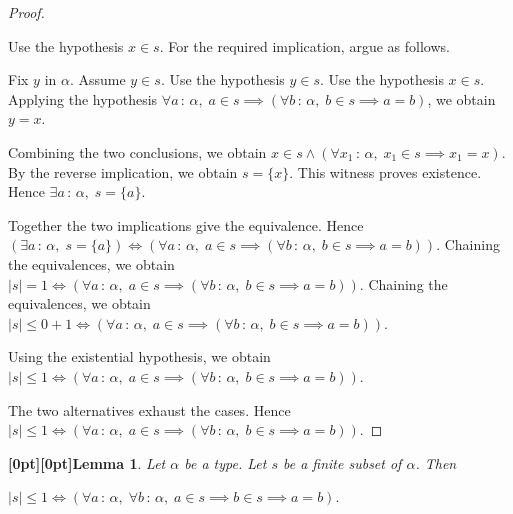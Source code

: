 \documentclass{article}
\makeatletter
\newcommand{\paperanchor}[1]{\hypertarget{#1}{}}%
\def\paperdest{\pdfextension dest}\def\paperstart{\pdfextension startlink}%
\def\paperend{\pdfextension endlink}\def\papercolor{\pdfextension colorstack}%
\let\paperdest\pdfdest\let\paperstart\pdfstartlink\let\paperend\pdfendlink\let\papercolor\pdfcolorstack
\newcommand{\paperanchor}[1]{\paperdest name{#1} xyz}%
\newcommand{\paperanchor}[1]{\special{pdf:dest (#1) [@thispage /XYZ null @ypos null]}}%
\newcommand{\paperlineanchor}[1]{\raisebox{10pt}[0pt][0pt]{\paperanchor{#1}}}
\DeclareRobustCommand{\paperresultname}[1]{\paperlineanchor{theorem:\arabic{theorem}}#1}
\theoremstyle{paperresult}
\newtheorem{lemma}[theorem]{\paperresultname{Lemma}}
\newenvironment{proofstep}{\par\smallskip\ifdim\leftskip<3em\relax\advance\leftskip by 1em\relax\fi\noindent\ignorespaces}{\par\smallskip}
\makeatother
\begin{document}
\begin{proof}
\begin{proofstep}
\begin{proofstep}
\begin{proofstep}
Use the hypothesis \(x \in s\).
For the required implication, argue as follows.
\begin{proofstep}
Fix \(y\) in \(\alpha\).
Assume \(y \in s\).
Use the hypothesis \(y \in s\).
Use the hypothesis \(x \in s\).
Applying the hypothesis \(\forall a\, :\, \alpha,\; a \in s \implies \left(\forall b\, :\, \alpha,\; b \in s \implies a = b\right)\), we obtain \(y = x\).
\end{proofstep}
Combining the two conclusions, we obtain \(x \in s \land \left(\forall x_{1}\, :\, \alpha,\; x_{1} \in s \implies x_{1} = x\right)\).
By the reverse implication, we obtain \(s = \{x\}\).
This witness proves existence. Hence \(\exists a\, :\, \alpha,\; s = \{a\}\).
\end{proofstep}
Together the two implications give the equivalence. Hence \((\exists a\, :\, \alpha,\; s = \{a\}) \iff (\forall a\, :\, \alpha,\; a \in s \implies (\forall b\, :\, \alpha,\; b \in s \implies a = b))\).
Chaining the equivalences, we obtain \(|s| = 1 \iff (\forall a\, :\, \alpha,\; a \in s \implies (\forall b\, :\, \alpha,\; b \in s \implies a = b))\).
Chaining the equivalences, we obtain \(|s| \le 0 + 1 \iff (\forall a\, :\, \alpha,\; a \in s \implies (\forall b\, :\, \alpha,\; b \in s \implies a = b))\).
\end{proofstep}
Using the existential hypothesis, we obtain \(|s| \le 1 \iff (\forall a\, :\, \alpha,\; a \in s \implies (\forall b\, :\, \alpha,\; b \in s \implies a = b))\).
\end{proofstep}
The two alternatives exhaust the cases. Hence \(|s| \le 1 \iff (\forall a\, :\, \alpha,\; a \in s \implies (\forall b\, :\, \alpha,\; b \in s \implies a = b))\).
\end{proof}

\begin{lemma}\label{theorem:109}
Let \(\alpha\) be a type. Let \(s\) be a finite subset of \(\alpha\). Then
\begin{center}
\(\displaystyle |s| \le 1 \iff (\forall a\, :\, \alpha,\; \forall b\, :\, \alpha,\; a \in s \implies b \in s \implies a = b).\)
\end{center}
\end{lemma}
\end{document}
